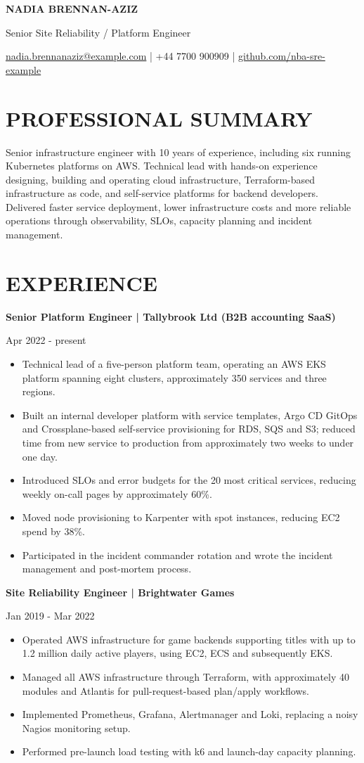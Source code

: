 \documentclass[11pt,a4paper]{article}
\newcommand{\cvsection}[1]{\section*{#1}}
\newcommand{\cvrole}[2]{\needspace{5\baselineskip}\noindent\textbf{#1}\par\noindent #2\par}
\begin{document}
{\LARGE\bfseries\color{primarycolor} NADIA BRENNAN-AZIZ}\par
{\large\color{accentcolor} Senior Site Reliability / Platform Engineer}\par
{\small \href{mailto:nadia.brennanaziz@example.com}{nadia.brennanaziz@example.com} | +44 7700 900909 | \href{https://github.com/nba-sre-example}{github.com/nba-sre-example}}\par

\cvsection{PROFESSIONAL SUMMARY}
Senior infrastructure engineer with 10 years of experience, including six running Kubernetes platforms on AWS. Technical lead with hands-on experience designing, building and operating cloud infrastructure, Terraform-based infrastructure as code, and self-service platforms for backend developers. Delivered faster service deployment, lower infrastructure costs and more reliable operations through observability, SLOs, capacity planning and incident management.

\cvsection{EXPERIENCE}
\cvrole{Senior Platform Engineer | Tallybrook Ltd (B2B accounting SaaS)}{Apr 2022 - present}
\begin{itemize}
\item Technical lead of a five-person platform team, operating an AWS EKS platform spanning eight clusters, approximately 350 services and three regions.
\item Built an internal developer platform with service templates, Argo CD GitOps and Crossplane-based self-service provisioning for RDS, SQS and S3; reduced time from new service to production from approximately two weeks to under one day.
\item Introduced SLOs and error budgets for the 20 most critical services, reducing weekly on-call pages by approximately 60\%.
\item Moved node provisioning to Karpenter with spot instances, reducing EC2 spend by 38\%.
\item Participated in the incident commander rotation and wrote the incident management and post-mortem process.
\end{itemize}

\cvrole{Site Reliability Engineer | Brightwater Games}{Jan 2019 - Mar 2022}
\begin{itemize}
\item Operated AWS infrastructure for game backends supporting titles with up to 1.2 million daily active players, using EC2, ECS and subsequently EKS.
\item Managed all AWS infrastructure through Terraform, with approximately 40 modules and Atlantis for pull-request-based plan/apply workflows.
\item Implemented Prometheus, Grafana, Alertmanager and Loki, replacing a noisy Nagios monitoring setup.
\item Performed pre-launch load testing with k6 and launch-day capacity planning.
\end{itemize}
\end{document}
